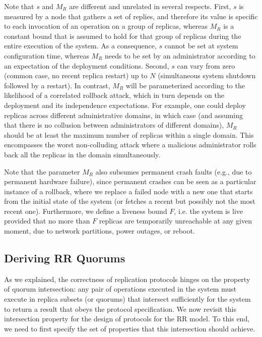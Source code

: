 Note that $s$ and $M_R$ are different and unrelated in several
respects. First, $s$ is measured by a node that gathers a set of
replies, and therefore its value is specific to each invocation
of an operation on a group of replicas, whereas $M_R$ is a
constant bound that is assumed to hold for that group of replicas
during the entire execution of the system. As a consequence, $s$
cannot be set at system configuration time, whereas $M_R$ needs
to be set by an administrator according to an expectation of the
deployment conditions. Second, $s$ can vary from zero (common
case, no recent replica restart) up to $N$ (simultaneous system
shutdown followed by a restart). In contrast, $M_R$ will be
parameterized according to the likelihood of a correlated
rollback attack, which in turn depends on the deployment and its
independence expectations. For example, one could deploy replicas
across different administrative domains, in which case (and
assuming that there is no collusion between administrators of
different domains), $M_R$ should be at least the maximum number
of replicas within a single domain. This encompasses the worst
non-colluding attack where a malicious administrator rolls back
all the replicas in the domain simultaneously.

Note that the parameter $M_R$ also subsumes permanent crash
faults (e.g., due to permanent hardware failure), since permanent
crashes can be seen as a particular instance of a rollback, where
we replace a failed node with a new one that starts from the
initial state of the system (or fetches a recent but possibly not
the most recent one).
%
Furthermore, we define a liveness bound $F$, i.e. the system is live
provided that no more than $F$ replicas are temporarily unreachable at
any given moment, due to network partitions, power outages, or reboot.

\subsection{Deriving {\ac{RR} Quorums}}\label{sec:parameters}

As we explained, the correctness of replication protocols hinges
on the property of quorum intersection: any pair of operations
executed in the system must execute in replica subsets (or
quorums) that intersect sufficiently for the system to return a
result that obeys the protocol specification. We now revisit this
intersection property for the design of protocols for the \ac{RR}
model. To this end, we need to first specify the set of
properties that this intersection should achieve.


